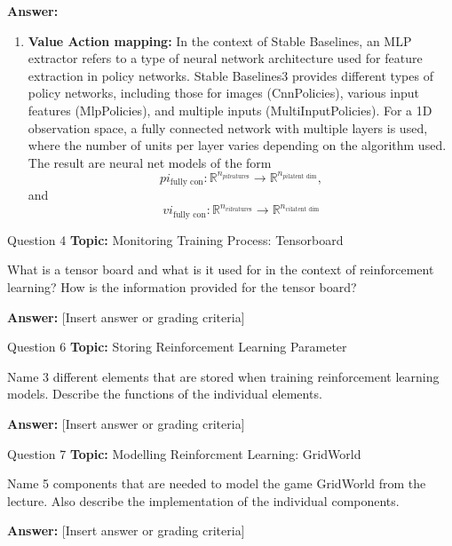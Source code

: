 \begin{frame}
    \textbf{Answer:}
    \begin{enumerate}[3.]
        \item \textbf{Value Action mapping:} In the context of Stable Baselines, an MLP extractor refers to a type of neural network architecture used for feature extraction in policy networks. Stable Baselines3 provides different types of policy networks, including those for images (CnnPolicies), various input features (MlpPolicies), and multiple inputs (MultiInputPolicies). For a 1D observation space, a fully connected network with multiple layers is used, where the number of units per layer varies depending on the algorithm used. The result are neural net models of the form
        \[pi_{\text{fully con}}: \mathbb{R}^{n_{pi \text{features}}} \rightarrow \mathbb{R}^{n_{pi \text{latent dim}}},\] and
        \[vi_{\text{fully con}}: \mathbb{R}^{n_{vi \text{features}}} \rightarrow \mathbb{R}^{n_{vi \text{latent dim}}}\]
    \end{enumerate}
\end{frame}

\begin{frame}{Question 4}
    \textbf{Topic:} Monitoring Training Process: Tensorboard
    \vspace{10pt}

    What is a tensor board and what is it used for in the context of reinforcement learning? How is the information provided for the tensor board? 

    \vspace{20pt}

    \textbf{Answer:} [Insert answer or grading criteria]
\end{frame}

\begin{frame}{Question 6}
    \textbf{Topic:} Storing Reinforcement Learning Parameter
    \vspace{10pt}

    Name 3 different elements that are stored when training reinforcement learning models. Describe the functions of the individual elements.

    \vspace{20pt}

    \textbf{Answer:} [Insert answer or grading criteria]
\end{frame}

\begin{frame}{Question 7}
    \textbf{Topic:} Modelling Reinforcment Learning: GridWorld
    \vspace{10pt}

    Name 5 components that are needed to model the game GridWorld from the lecture. Also describe the implementation of the individual components.  
    \vspace{20pt}

    \textbf{Answer:} [Insert answer or grading criteria]
\end{frame}

